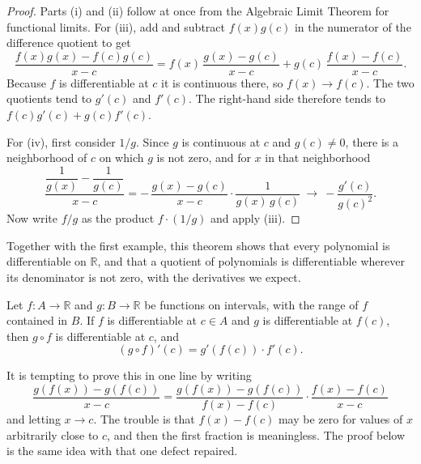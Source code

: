 \begin{proof}
Parts (i) and (ii) follow at once from the Algebraic Limit Theorem for functional limits.  For (iii), add and subtract $f(x) g(c)$ in the numerator of the difference quotient to get
\[ \frac{f(x) g(x) - f(c) g(c)}{x - c} = f(x)\,\frac{g(x) - g(c)}{x - c} + g(c)\,\frac{f(x) - f(c)}{x - c}. \]
Because $f$ is differentiable at $c$ it is continuous there, so $f(x) \to f(c)$.  The two quotients tend to $g'(c)$ and $f'(c)$.  The right-hand side therefore tends to $f(c) g'(c) + g(c) f'(c)$.

For (iv), first consider $1/g$.  Since $g$ is continuous at $c$ and $g(c) \neq 0$, there is a neighborhood of $c$ on which $g$ is not zero, and for $x$ in that neighborhood
\[ \frac{\dfrac{1}{g(x)} - \dfrac{1}{g(c)}}{x - c} = -\,\frac{g(x) - g(c)}{x - c} \cdot \frac{1}{g(x)\,g(c)} \ \longrightarrow\ -\frac{g'(c)}{g(c)^2}. \]
Now write $f/g$ as the product $f \cdot (1/g)$ and apply (iii).
\end{proof}

Together with the first example, this theorem shows that every polynomial is differentiable on $\mathbb{R}$, and that a quotient of polynomials is differentiable wherever its denominator is not zero, with the derivatives we expect.

\begin{theorem}\label{thm:chain-rule}
Let $f : A \to \mathbb{R}$ and $g : B \to \mathbb{R}$ be functions on intervals, with the range of $f$ contained in $B$.  If $f$ is differentiable at $c \in A$ and $g$ is differentiable at $f(c)$, then $g \circ f$ is differentiable at $c$, and
\[ (g \circ f)'(c) = g'(f(c)) \cdot f'(c). \]
\end{theorem}

It is tempting to prove this in one line by writing
\[ \frac{g(f(x)) - g(f(c))}{x - c} = \frac{g(f(x)) - g(f(c))}{f(x) - f(c)} \cdot \frac{f(x) - f(c)}{x - c} \]
and letting $x \to c$.  The trouble is that $f(x) - f(c)$ may be zero for values of $x$ arbitrarily close to $c$, and then the first fraction is meaningless.  The proof below is the same idea with that one defect repaired.

